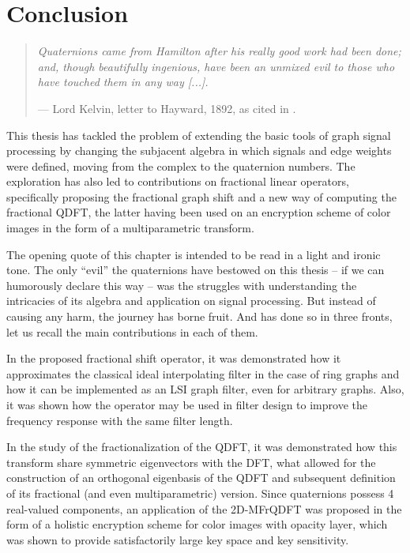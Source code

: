 \chapter{Conclusion}
\label{ch:conclusion}

\begin{quotation}
    \itshape
    Quaternions came from Hamilton after his really good work had been done; and, though beautifully ingenious, have been an unmixed evil to those who have touched them in any way [...].

    \noindent --- Lord Kelvin, letter to Hayward, 1892, as cited in \parencite{altmann1989hamilton}.
\end{quotation}

This thesis has tackled the problem of extending the basic tools of graph signal processing by changing the subjacent algebra in which signals and edge weights were defined, moving from the complex to the quaternion numbers. The exploration has also led to contributions on fractional linear operators, specifically proposing the fractional graph shift and a new way of computing the fractional QDFT, the latter having been used on an encryption scheme of color images in the form of a multiparametric transform.

The opening quote of this chapter is intended to be read in a light and ironic tone. The only ``evil'' the quaternions have bestowed on this thesis -- if we can humorously declare this way --  was the struggles with understanding the intricacies of its algebra and application on signal processing. But instead of causing any harm, the journey has borne fruit. And has done so in three fronts, let us recall the main contributions in each of them.

In the proposed fractional shift operator, it was demonstrated how it approximates  the classical ideal interpolating filter in the case of ring graphs and how it can be implemented as an LSI graph filter, even for arbitrary graphs. Also, it was shown how the operator may be used in filter design to improve the frequency response with the same filter length.

In the study of the fractionalization of the QDFT, it was demonstrated how this transform share symmetric eigenvectors with the DFT, what allowed for the construction of an orthogonal eigenbasis of the QDFT and subsequent definition of its fractional (and even multiparametric) version. Since quaternions possess 4 real-valued components, an application of the 2D-MFrQDFT was proposed in the form of a holistic encryption scheme for color images with opacity layer, which was shown to provide satisfactorily large key space and key sensitivity.

